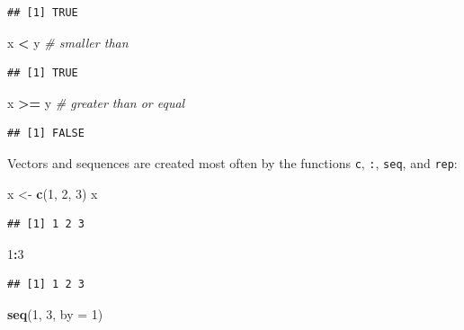\documentclass[12pt,]{book}
\newenvironment{Shaded}{\begin{snugshade}}{\end{snugshade}}
\newcommand{\CommentTok}[1]{\textcolor[rgb]{0.56,0.35,0.01}{\textit{#1}}}
\newcommand{\DataTypeTok}[1]{\textcolor[rgb]{0.13,0.29,0.53}{#1}}
\newcommand{\DecValTok}[1]{\textcolor[rgb]{0.00,0.00,0.81}{#1}}
\newcommand{\KeywordTok}[1]{\textcolor[rgb]{0.13,0.29,0.53}{\textbf{#1}}}
\newcommand{\NormalTok}[1]{#1}
\newcommand{\OperatorTok}[1]{\textcolor[rgb]{0.81,0.36,0.00}{\textbf{#1}}}
\newcommand{\StringTok}[1]{\textcolor[rgb]{0.31,0.60,0.02}{#1}}
\begin{document}
\begin{verbatim}
## [1] TRUE
\end{verbatim}

\begin{Shaded}
\begin{Highlighting}[]
\NormalTok{x }\OperatorTok{<}\StringTok{ }\NormalTok{y }\CommentTok{# smaller than}
\end{Highlighting}
\end{Shaded}

\begin{verbatim}
## [1] TRUE
\end{verbatim}

\begin{Shaded}
\begin{Highlighting}[]
\NormalTok{x }\OperatorTok{>=}\StringTok{ }\NormalTok{y }\CommentTok{# greater than or equal}
\end{Highlighting}
\end{Shaded}

\begin{verbatim}
## [1] FALSE
\end{verbatim}

Vectors and sequences are created most often by the functions
\texttt{c}, \texttt{:}, \texttt{seq}, and \texttt{rep}:

\begin{Shaded}
\begin{Highlighting}[]
\NormalTok{x <-}\StringTok{ }\KeywordTok{c}\NormalTok{(}\DecValTok{1}\NormalTok{, }\DecValTok{2}\NormalTok{, }\DecValTok{3}\NormalTok{)}
\NormalTok{x}
\end{Highlighting}
\end{Shaded}

\begin{verbatim}
## [1] 1 2 3
\end{verbatim}

\begin{Shaded}
\begin{Highlighting}[]
\DecValTok{1}\OperatorTok{:}\DecValTok{3}
\end{Highlighting}
\end{Shaded}

\begin{verbatim}
## [1] 1 2 3
\end{verbatim}

\begin{Shaded}
\begin{Highlighting}[]
\KeywordTok{seq}\NormalTok{(}\DecValTok{1}\NormalTok{, }\DecValTok{3}\NormalTok{, }\DataTypeTok{by =} \DecValTok{1}\NormalTok{)}
\end{Highlighting}
\end{Shaded}
\end{document}
